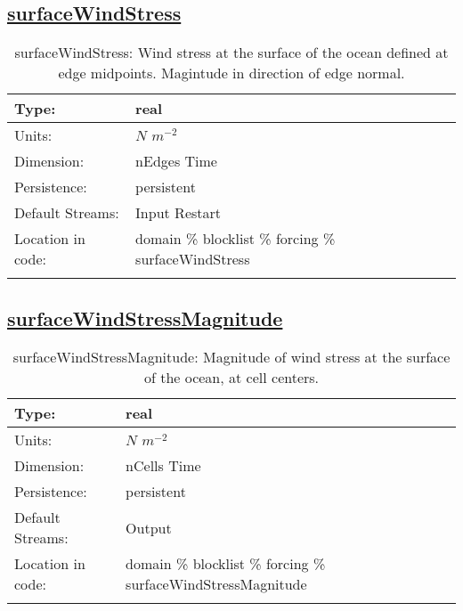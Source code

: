 \subsection[surfaceWindStress]{\hyperref[sec:var_tab_forcing]{surfaceWindStress}}
\label{subsec:var_sec_forcing_surfaceWindStress}
\begin{center}
\begin{longtable}{| p{2.0in} | p{4.0in} |}
        \hline 
        Type: & real \\
        \hline 
        Units: & $N$ $m^{-2}$ \\
        \hline 
        Dimension: & nEdges Time \\
        \hline 
        Persistence: & persistent \\
        \hline 
		 Default Streams: & Input Restart  \\
        \hline 
		 Location in code: & domain \% blocklist \% forcing \% surfaceWindStress \\
		 \hline 
    \caption{surfaceWindStress: Wind stress at the surface of the ocean defined at edge midpoints. Magintude in direction of edge normal.}
\end{longtable}
\end{center}
\subsection[surfaceWindStressMagnitude]{\hyperref[sec:var_tab_forcing]{surfaceWindStressMagnitude}}
\label{subsec:var_sec_forcing_surfaceWindStressMagnitude}
\begin{center}
\begin{longtable}{| p{2.0in} | p{4.0in} |}
        \hline 
        Type: & real \\
        \hline 
        Units: & $N$ $m^{-2}$ \\
        \hline 
        Dimension: & nCells Time \\
        \hline 
        Persistence: & persistent \\
        \hline 
		 Default Streams: & Output  \\
        \hline 
		 Location in code: & domain \% blocklist \% forcing \% surfaceWindStressMagnitude \\
		 \hline 
    \caption{surfaceWindStressMagnitude: Magnitude of wind stress at the surface of the ocean, at cell centers.}
\end{longtable}
\end{center}
